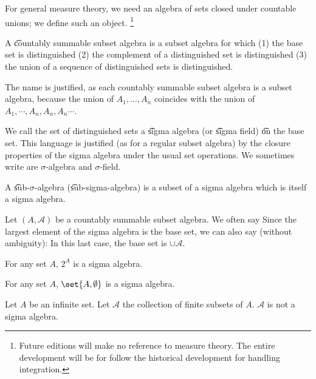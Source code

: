 

For general measure theory, we need an algebra of sets closed under countable unions; we define such an object.
  \ifhmode\unskip\fi\footnote{
Future editions will make no reference to measure theory. The entire development will be for follow the historical development for handling integration.
  }


A \t{countably summable subset algebra} is a subset algebra for which (1) the base set is distinguished (2) the complement of a distinguished set is distinguished (3) the union of a sequence of distinguished sets is distinguished.

The name is justified, as each countably summable subset algebra is a subset algebra, because the union of $A_1, \dots , A_n$ coincides with the union of $A_1, \cdots, A_n, A_n, A_n \cdots$.

We call the set of distinguished sets a \t{sigma algebra} (or \t{sigma field}) \t{on} the base set.
This language is justified (as for a regular subset algebra) by the closure properties of the sigma algebra under the usual set operations.
We sometimes write are $\sigma $-algebra and $\sigma $-field.

A \t{sub-$\sigma $-algebra} (\t{sub-sigma-algebra}) is a subset of a sigma algebra which is itself a sigma algebra.


Let $(A, \mathcal{A} )$ be a countably summable subset algebra.
We often say 
Since the largest element of the sigma algebra is the base set, we can also say (without ambiguity): 
In this last case, the base set is $\cup \mathcal{A} $.


\begin{expl}
For any set $A$, $2^{A}$ is a sigma algebra.
\end{expl}

\begin{expl}
For any set $A$,
$\set{A, \emptyset}$ is a sigma algebra.
\end{expl}

\begin{expl}
Let $A$ be an infinite set.
Let $\mathcal{A} $ the collection
of finite subsets of $A$.
$\mathcal{A} $ is not a sigma algebra.
\end{expl}

